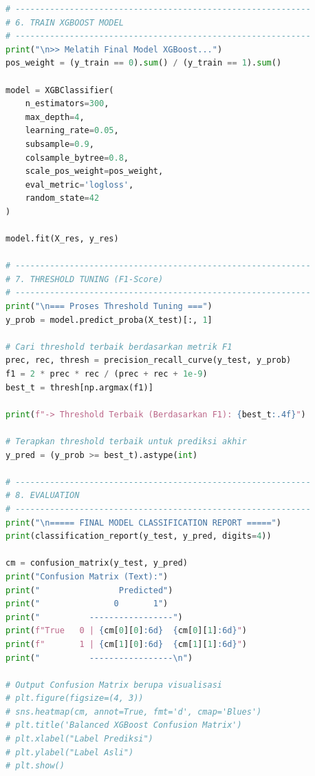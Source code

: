 \begin{lstlisting}[language=Python, caption={Kode 3}]
# ------------------------------------------------------------
# 6. TRAIN XGBOOST MODEL
# ------------------------------------------------------------
print("\n>> Melatih Final Model XGBoost...")
pos_weight = (y_train == 0).sum() / (y_train == 1).sum()

model = XGBClassifier(
    n_estimators=300,
    max_depth=4,
    learning_rate=0.05,
    subsample=0.9,
    colsample_bytree=0.8,
    scale_pos_weight=pos_weight,
    eval_metric='logloss',
    random_state=42
)

model.fit(X_res, y_res)

# ------------------------------------------------------------
# 7. THRESHOLD TUNING (F1-Score)
# ------------------------------------------------------------
print("\n=== Proses Threshold Tuning ===")
y_prob = model.predict_proba(X_test)[:, 1]

# Cari threshold terbaik berdasarkan metrik F1
prec, rec, thresh = precision_recall_curve(y_test, y_prob)
f1 = 2 * prec * rec / (prec + rec + 1e-9)
best_t = thresh[np.argmax(f1)]

print(f"-> Threshold Terbaik (Berdasarkan F1): {best_t:.4f}")

# Terapkan threshold terbaik untuk prediksi akhir
y_pred = (y_prob >= best_t).astype(int)

# ------------------------------------------------------------
# 8. EVALUATION
# ------------------------------------------------------------
print("\n===== FINAL MODEL CLASSIFICATION REPORT =====")
print(classification_report(y_test, y_pred, digits=4))

cm = confusion_matrix(y_test, y_pred)
print("Confusion Matrix (Text):")
print("                Predicted")
print("               0       1")
print("          -----------------")
print(f"True   0 | {cm[0][0]:6d}  {cm[0][1]:6d}")
print(f"       1 | {cm[1][0]:6d}  {cm[1][1]:6d}")
print("          -----------------\n")

# Output Confusion Matrix berupa visualisasi
# plt.figure(figsize=(4, 3))
# sns.heatmap(cm, annot=True, fmt='d', cmap='Blues')
# plt.title('Balanced XGBoost Confusion Matrix')
# plt.xlabel("Label Prediksi")
# plt.ylabel("Label Asli")
# plt.show()
\end{lstlisting}

